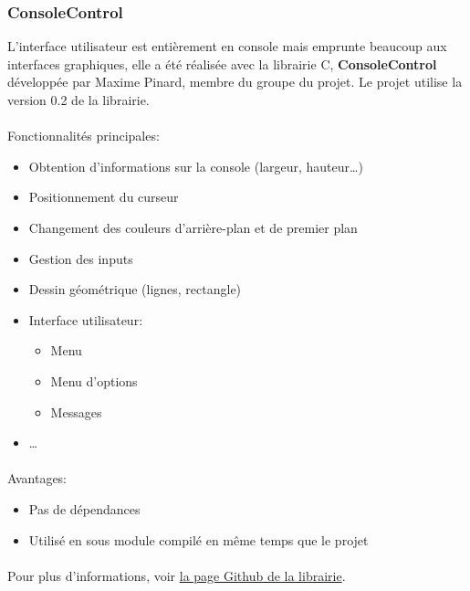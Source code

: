 \documentclass[article, backcover, french, nodocumentinfo]{upmethodology-document}
\begin{document}
			\subsubsection{ConsoleControl}
				L'interface utilisateur est entièrement en console mais emprunte beaucoup aux interfaces graphiques, elle a été réalisée avec la librairie C, \textbf{ConsoleControl} développée par Maxime Pinard, membre du groupe du projet. Le projet utilise la version 0.2 de la librairie.
				\paragraph*{}
					Fonctionnalités principales:
					\begin{itemize}
						\item Obtention d'informations sur la console (largeur, hauteur\ldots)
						\item Positionnement du curseur
						\item Changement des couleurs d'arrière-plan et de premier plan
						\item Gestion des inputs
						\item Dessin géométrique (lignes, rectangle)
						\item Interface utilisateur:
							\begin{itemize}
								\item Menu
								\item Menu d'options
								\item Messages
							\end{itemize}
						\item \ldots
					\end{itemize}
				\paragraph*{}
					Avantages:
					\begin{itemize}
						\item Pas de dépendances
						\item Utilisé en sous module compilé en même temps que le projet
					\end{itemize}
				\paragraph*{}
					Pour plus d'informations, voir \href{https://github.com/pinam45/ConsoleControl}{la page Github de la librairie}.
\end{document}
